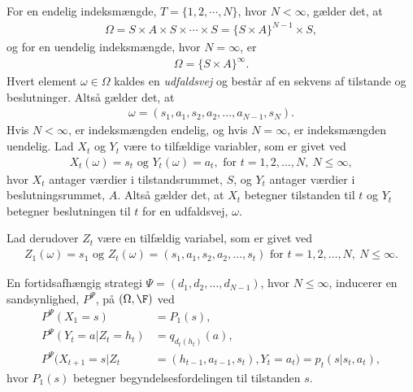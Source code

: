 For en endelig indeksmængde, $T=\{1, 2,\cdots, N\}$, hvor $N<\infty$, gælder det, at
\begin{align*}
    \Omega = S \times A \times S \times \cdots \times S = \{S \times A\}^{N-1} \times S,
\end{align*}
og for en uendelig indeksmængde, hvor $N=\infty$, er 
\begin{align*}
    \Omega = \{S \times A\}^\infty.
\end{align*}
Hvert element $\omega \in \Omega$ kaldes en \textit{udfaldsvej} og består af en sekvens af tilstande og beslutninger. Altså gælder det, at
\begin{align*}
    \omega=(s_1 , a_1 , s_2 , a_2 , \dots , a_{N-1} , s_N).
\end{align*}
Hvis $N<\infty$, er indeksmængden endelig, og hvis $N=\infty$, er indeksmængden uendelig. 
Lad $X_t$ og $Y_t$ være to tilfældige variabler, som er givet ved
\begin{align*}
    X_t(\omega) = s_t \text{ og } Y_t(\omega) = a_t, \text{ for } t=1,2,\dots, N, \  N\leq \infty,
\end{align*}
hvor $X_t$ antager værdier i tilstandsrummet, $S$, og $Y_t$ antager værdier i beslutningsrummet, $A$. Altså gælder det, at $X_t$ betegner tilstanden til $t$ og $Y_t$ betegner beslutningen til $t$ for en udfaldsvej, $\omega$.

Lad derudover $Z_t$ være en tilfældig variabel, som er givet ved
\begin{align*}
    Z_1(\omega) = s_1 \text{ og } Z_t(\omega) = (s_1 , a_1 , s_2 , a_2 , \dots , s_t) \text{ for } t=1,2, \dots, N, \  N\leq \infty.
\end{align*}

En fortidsafhængig strategi $\Psi = (d_1, d_2, \dots, d_{N-1})$, hvor $N \leq \infty$, inducerer en sandsynlighed, $P^\Psi$, på $(\Omega, \F)$ ved
\begin{align}
    P^{\Psi}(X_1=s)&=P_1(s)\label{eqs:de_tre_ligninger},\\
    P^{\Psi}\left(Y_t=a|Z_t=h_t\right)&= q_{d_t(h_t)}(a)\label{eqs:de_tre_ligninger2},\\
    P^{\Psi}\big(X_{t+1}=s|Z_t&=(h_{t-1}, a_{t-1}, s_t), Y_t=a_t \big)=p_t(s|s_t, a_t), \label{eqs:de_tre_ligninger3}
\end{align}
hvor $P_1(s)$ betegner begyndelsesfordelingen til tilstanden $s$.

